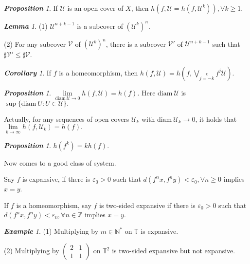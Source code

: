 \documentclass[10pt, a4paper, oneside]{report}
\numberwithin{equation}{chapter}
\theoremstyle{remark}
\newtheorem{lemma}[definition]{\bf{Lemma}}
\newtheorem{proposition}[definition]{\bf{Proposition}}
\newtheorem{corollary}[definition]{\bf{Corollary}}
\theoremstyle{remark}
\newtheorem{example}{\bf{Example}}[chapter]
\begin{document}
\begin{proposition}
    If $\mathcal{U}$ is an open cover of $X$, then $h(f,\mathcal{U}=h(f,\mathcal{U}^k)),\forall k\geqslant 1.$
\end{proposition}

\begin{lemma}
    (1) $\mathcal{U}^{n+k-1}$ is a subcover of $(\mathcal{U}^k)^n.$

    (2) For any subcover $\mathcal{V}$ of $(\mathcal{U}^k)^n$, there is a subcover $\mathcal{V}'$ of $\mathcal{U}^{n+k-1}$ such that $\sharp\mathcal{V}'\leqslant\sharp\mathcal{V}$.
\end{lemma}

\begin{corollary}
    If $f$ is a homeomorphism, then $h(f,\mathcal{U})=h(f,\bigvee\limits_{j=-k}\limits^k f^j\mathcal{U})$.
\end{corollary}

\begin{proposition}
    $\lim\limits_{\mathrm{diam}~\mathcal{U}\to 0}h(f,\mathcal{U})=h(f)$. Here $\mathrm{diam}~\mathcal{U}$ is $\sup\{\mathrm{diam}~U:U\in\mathcal{U}\}.$
\end{proposition}
    
Actually, for any sequences of open covers $\mathcal{U}_k$ with $\mathrm{diam}~\mathcal{U}_k\to 0$, it holds that $\lim\limits_{k\to\infty}h(f,\mathcal{U}_k)=h(f).$

\begin{proposition}
    $h(f^k)=kh(f).$
\end{proposition}

Now comes to a good class of system.

Say $f$ is expansive, if there is $\varepsilon_0>0$ such that $d(f^nx,f^ny)<\varepsilon_0,\forall n\geqslant 0$ implies $x=y$.

If $f$ is a homeomorphism, say $f$ is two-sided expansive if there is $\varepsilon_0>0$ such that $d(f^nx,f^ny)<\varepsilon_0,\forall n\in\mathbb{Z}$ implies $x=y$.

\begin{example}
    (1) Multiplying by $m\in\mathbb{N}^*$ on $\mathbb{T}$ is expansive.

    (2) Multiplying by $\begin{pmatrix}2&1\\1&1\end{pmatrix}$ on $\mathbb{T}^2$ is two-sided expansive but not expansive.
\end{example}
\end{document}
